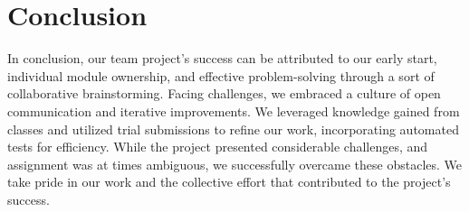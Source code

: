 \section{Conclusion}
\label{Conclusion}

In conclusion, our team project's success can be attributed to our early start, individual module ownership, and effective problem-solving through a sort of collaborative brainstorming. Facing challenges, we embraced a culture of open communication and iterative improvements. We leveraged knowledge gained from classes and utilized trial submissions to refine our work, incorporating automated tests for efficiency.
While the project presented considerable challenges, and assignment was at times ambiguous, we successfully overcame these obstacles. We take pride in our work and the collective effort that contributed to the project's success.
